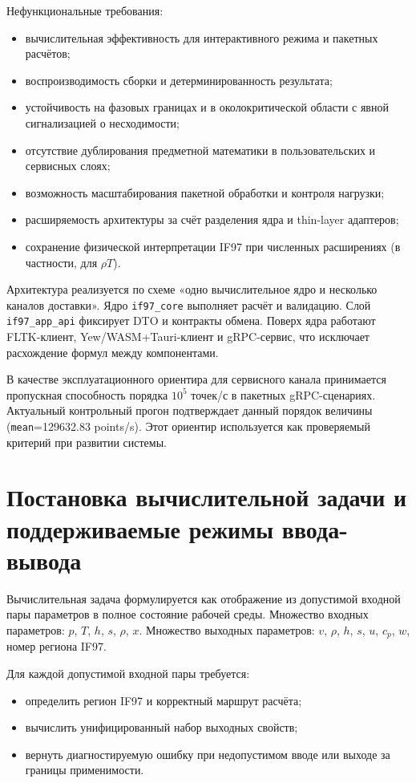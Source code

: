 Нефункциональные требования:
\begin{itemize}
\item вычислительная эффективность для интерактивного режима и пакетных расчётов;
\item воспроизводимость сборки и детерминированность результата;
\item устойчивость на фазовых границах и в околокритической области с явной сигнализацией о несходимости;
\item отсутствие дублирования предметной математики в пользовательских и сервисных слоях;
\item возможность масштабирования пакетной обработки и контроля нагрузки;
\item расширяемость архитектуры за счёт разделения ядра и thin-layer адаптеров;
\item сохранение физической интерпретации IF97 при численных расширениях (в частности, для $\rho T$).
\end{itemize}

Архитектура реализуется по схеме «одно вычислительное ядро и несколько каналов доставки».
Ядро \texttt{if97\_core} выполняет расчёт и валидацию.
Слой \texttt{if97\_app\_api} фиксирует DTO и контракты обмена.
Поверх ядра работают FLTK-клиент, Yew/WASM+Tauri-клиент и gRPC-сервис,
что исключает расхождение формул между компонентами.

В качестве эксплуатационного ориентира для сервисного канала принимается
пропускная способность порядка $10^5$ точек/с
в пакетных gRPC-сценариях.
Актуальный контрольный прогон
подтверждает данный порядок величины
(\texttt{mean}=129632.83 points/s).
Этот ориентир используется как проверяемый критерий при развитии системы.

\section{Постановка вычислительной задачи и поддерживаемые режимы ввода-вывода}

Вычислительная задача формулируется как отображение
из допустимой входной пары параметров в полное состояние рабочей среды.
Множество входных параметров: $p$, $T$, $h$, $s$, $\rho$, $x$.
Множество выходных параметров: $v$, $\rho$, $h$, $s$, $u$, $c_p$, $w$, номер региона IF97.

Для каждой допустимой входной пары требуется:
\begin{itemize}
\item определить регион IF97 и корректный маршрут расчёта;
\item вычислить унифицированный набор выходных свойств;
\item вернуть диагностируемую ошибку при недопустимом вводе или выходе за границы применимости.
\end{itemize}

